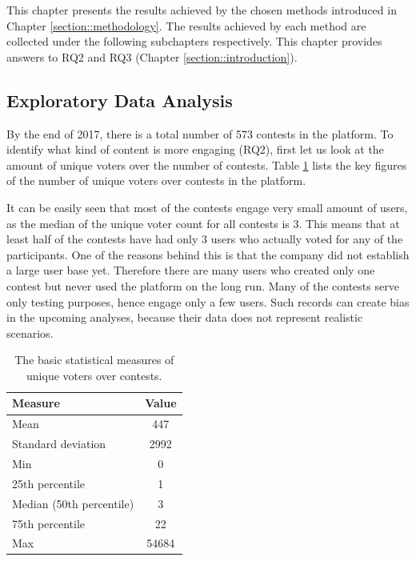 This chapter presents the results achieved by the chosen methods introduced in Chapter \ref{section::methodology}. The results achieved by each method are collected under the following subchapters respectively. This chapter provides answers to RQ2 and RQ3 (Chapter \ref{section::introduction}).

\subsection{Exploratory Data Analysis}
\label{section::exploratory-data-analysis}
    By the end of 2017, there is a total number of 573 contests in the platform. To identify what kind of content is more engaging (RQ2), first let us look at the amount of unique voters over the number of contests. Table \ref{user_engagement_in_contests} lists the key figures of the number of unique voters over contests in the platform. 

    It can be easily seen that most of the contests engage very small amount of users, as the median of the unique voter count for all contests is 3. This means that at least half of the contests have had only 3 users who actually voted for any of the participants. One of the reasons behind this is that the company did not establish a large user base yet. Therefore there are many users who created only one contest but never used the platform on the long run. Many of the contests serve only testing purposes, hence engage only a few users. Such records can create bias in the upcoming analyses, because their data does not represent realistic scenarios. 

    \begin{table}[H]
        \centering
        \begin{tabular}{l|c}
            \textbf{Measure} & \textbf{Value} \\
            \hline
            Mean & 447 \\
            Standard deviation & 2992 \\
            Min & 0 \\
            25th percentile & 1 \\
            Median (50th percentile) & 3 \\
            75th percentile & 22 \\
            Max & 54684
        \end{tabular}
        \caption{The basic statistical measures of unique voters over contests.}
        \label{user_engagement_in_contests}
    \end{table}
    
